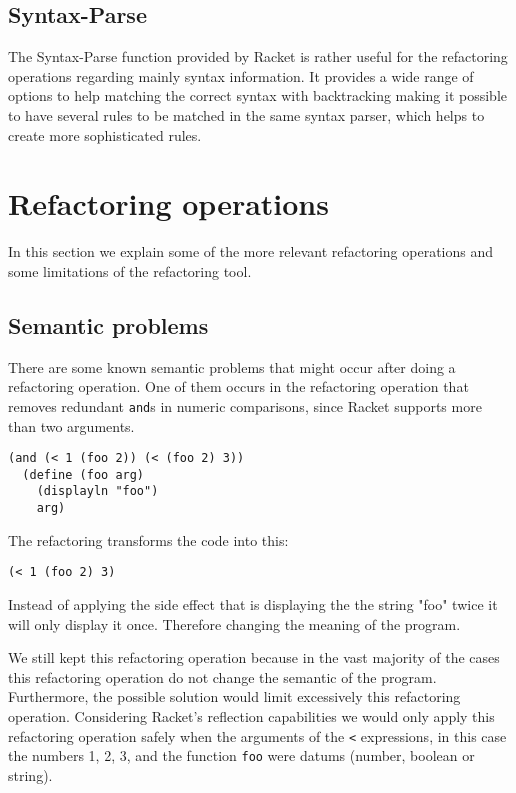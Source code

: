 \subsection{Syntax-Parse}

The Syntax-Parse function provided by Racket is rather useful for the refactoring
operations regarding mainly syntax information.
It provides a wide range of options to help matching the correct syntax with  %
backtracking making it possible to have several rules to be matched
in the same syntax parser, which helps to create more sophisticated rules.

\section{Refactoring operations}
In this section we explain some of the  more relevant refactoring operations and
some limitations of the refactoring tool.

\subsection{Semantic problems}
There are some known semantic problems that might occur after doing a refactoring
operation.
One of them occurs in the refactoring operation that removes redundant {\tt and}s
in numeric comparisons, since Racket supports more than two arguments.
\begin{lstlisting}[basicstyle=\ttfamily, caption=And example]
  (and (< 1 (foo 2)) (< (foo 2) 3))
  (define (foo arg)
    (displayln "foo")
    arg)
\end{lstlisting}
The refactoring transforms the code into this:
\begin{lstlisting}[basicstyle=\ttfamily, caption=Refactored code]
  (< 1 (foo 2) 3)
\end{lstlisting}


Instead of applying the side effect that is displaying the the string "foo"
 twice it will only display it once. Therefore changing the meaning of the program.

We still kept this refactoring operation because in the vast majority
of the cases this refactoring operation do not change the semantic of the program.
Furthermore, the possible solution would limit excessively this refactoring operation.  %
Considering Racket's reflection capabilities we would only apply this refactoring operation
safely when the arguments of the {\tt <} expressions, in this case the numbers 1, 2, 3, and the function {\tt foo}
 were datums (number, boolean or string).


